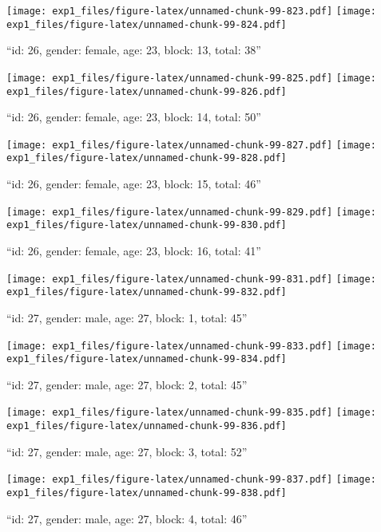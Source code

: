 \documentclass[,]{article}
\begin{document}
\texttt{[image: exp1\_files/figure-latex/unnamed-chunk-99-823.pdf]}
\texttt{[image: exp1\_files/figure-latex/unnamed-chunk-99-824.pdf]}

\newpage
[1] 

``id: 26, gender: female, age: 23, block: 13, total: 38''

\texttt{[image: exp1\_files/figure-latex/unnamed-chunk-99-825.pdf]}
\texttt{[image: exp1\_files/figure-latex/unnamed-chunk-99-826.pdf]}

\newpage
[1] 

``id: 26, gender: female, age: 23, block: 14, total: 50''

\texttt{[image: exp1\_files/figure-latex/unnamed-chunk-99-827.pdf]}
\texttt{[image: exp1\_files/figure-latex/unnamed-chunk-99-828.pdf]}

\newpage
[1] 

``id: 26, gender: female, age: 23, block: 15, total: 46''

\texttt{[image: exp1\_files/figure-latex/unnamed-chunk-99-829.pdf]}
\texttt{[image: exp1\_files/figure-latex/unnamed-chunk-99-830.pdf]}

\newpage
[1] 

``id: 26, gender: female, age: 23, block: 16, total: 41''

\texttt{[image: exp1\_files/figure-latex/unnamed-chunk-99-831.pdf]}
\texttt{[image: exp1\_files/figure-latex/unnamed-chunk-99-832.pdf]}

\newpage
[1] 

``id: 27, gender: male, age: 27, block: 1, total: 45''

\texttt{[image: exp1\_files/figure-latex/unnamed-chunk-99-833.pdf]}
\texttt{[image: exp1\_files/figure-latex/unnamed-chunk-99-834.pdf]}

\newpage
[1] 

``id: 27, gender: male, age: 27, block: 2, total: 45''

\texttt{[image: exp1\_files/figure-latex/unnamed-chunk-99-835.pdf]}
\texttt{[image: exp1\_files/figure-latex/unnamed-chunk-99-836.pdf]}

\newpage
[1] 

``id: 27, gender: male, age: 27, block: 3, total: 52''

\texttt{[image: exp1\_files/figure-latex/unnamed-chunk-99-837.pdf]}
\texttt{[image: exp1\_files/figure-latex/unnamed-chunk-99-838.pdf]}

\newpage
[1] 

``id: 27, gender: male, age: 27, block: 4, total: 46''
\end{document}
